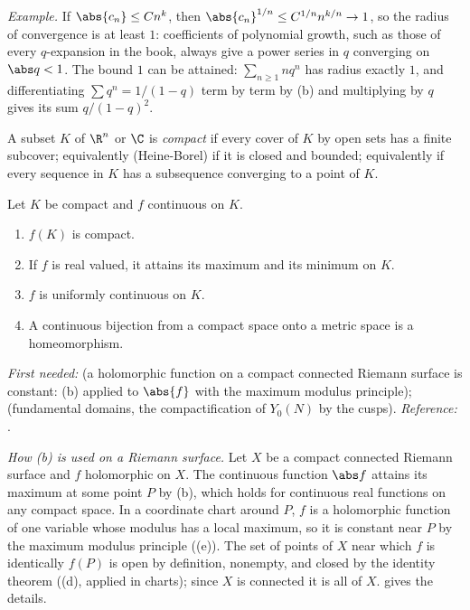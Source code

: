 \emph{Example.} If $\abs{c_n}\le Cn^k$, then $\abs{c_n}^{1/n}\le C^{1/n}n^{k/n}\to1$, so the radius of
convergence is at least $1$: coefficients of polynomial growth, such as those of every $q$-expansion
in the book, always give a power series in $q$ converging on $\abs q<1$. The bound $1$ can be
attained: $\sum_{n\ge1}nq^n$ has radius exactly $1$, and differentiating $\sum q^n=1/(1-q)$ term by
term by (b) and multiplying by $q$ gives its sum $q/(1-q)^2$.

\begin{definition}[compactness]\label{def:prereq:compact}
A subset $K$ of $\R^n$ or $\C$ is \emph{compact} if every cover of $K$ by open sets has a finite
subcover; equivalently (Heine-Borel) if it is closed and bounded; equivalently if every sequence
in $K$ has a subsequence converging to a point of $K$.
\end{definition}

\begin{theorem}\label{thm:prereq:compact}
Let $K$ be compact and $f$ continuous on $K$.
\begin{enumerate}[label=(\alph*)]
\item $f(K)$ is compact.
\item If $f$ is real valued, it attains its maximum and its minimum on $K$.
\item $f$ is uniformly continuous on $K$.
\item A continuous bijection from a compact space onto a metric space is a homeomorphism.
\end{enumerate}
\end{theorem}
\noindent\emph{First needed:}  (a holomorphic function on a compact connected
Riemann surface is constant: (b) applied to $\abs{f}$ with the maximum modulus principle);
 (fundamental domains, the compactification of $Y_0(N)$ by the cusps).
\emph{Reference:} \cite[Theorems 2.41, 4.14, 4.16 and 4.19]{Rudin76}.

\emph{How (b) is used on a Riemann surface.} Let $X$ be a compact connected Riemann surface and $f$
holomorphic on $X$. The continuous function $\abs f$ attains its maximum at some point $P$ by (b),
which holds for continuous real functions on any compact space. In a coordinate chart around $P$,
$f$ is a holomorphic function of one variable whose modulus has a local maximum, so it is constant
near $P$ by the maximum modulus principle ((e)). The set of points of $X$
near which $f$ is identically $f(P)$ is open by definition, nonempty, and closed by the identity
theorem ((d), applied in charts); since $X$ is connected it is all of $X$.
 gives the details.

